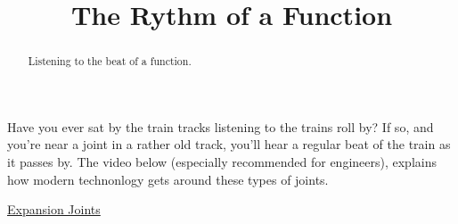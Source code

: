 \documentclass{ximera}
\title{The Rythm of a Function}
\begin{document}
\begin{abstract}
Listening to the beat of a function.
\end{abstract}
\maketitle

Have you ever sat by the train tracks listening to the trains roll by? If so, and you're near a joint in a rather old track, you'll hear a regular beat of the train as it passes by. The video below (especially recommended for engineers), explains how modern technonlogy gets around these types of joints.

\href{https://practical.engineering/blog/2023/12/5/why-railroads-dont-need-expansion-joints}{Expansion Joints}
\end{document}
